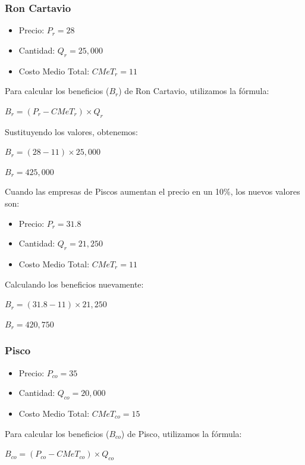 \documentclass[
  a4paper,
]{article}
\providecommand{\tightlist}{%
  \setlength{\itemsep}{0pt}\setlength{\parskip}{0pt}}\usepackage{longtable,booktabs,array}
\begin{document}
\hypertarget{ron-cartavio}{%
\subsubsection{Ron Cartavio}\label{ron-cartavio}}

\begin{itemize}
\tightlist
\item
  Precio: \(P_r = 28\)
\item
  Cantidad: \(Q_r = 25,000\)
\item
  Costo Medio Total: \(CMeT_r = 11\)
\end{itemize}

Para calcular los beneficios (\(B_r\)) de Ron Cartavio, utilizamos la
fórmula:

\(B_r = (P_r - CMeT_r) \times Q_r\)

Sustituyendo los valores, obtenemos:

\(B_r = (28 - 11) \times 25,000\)

\(B_r = 425,000\)

Cuando las empresas de Piscos aumentan el precio en un 10\%, los nuevos
valores son:

\begin{itemize}
\tightlist
\item
  Precio: \(P_r = 31.8\)
\item
  Cantidad: \(Q_r = 21,250\)
\item
  Costo Medio Total: \(CMeT_r = 11\)
\end{itemize}

Calculando los beneficios nuevamente:

\(B_r = (31.8 - 11) \times 21,250\)

\(B_r = 420,750\)

\hypertarget{pisco}{%
\subsubsection{Pisco}\label{pisco}}

\begin{itemize}
\tightlist
\item
  Precio: \(P_{co} = 35\)
\item
  Cantidad: \(Q_{co} = 20,000\)
\item
  Costo Medio Total: \(CMeT_{co} = 15\)
\end{itemize}

Para calcular los beneficios (\(B_{co}\)) de Pisco, utilizamos la
fórmula:

\(B_{co} = (P_{co} - CMeT_{co}) \times Q_{co}\)
\end{document}
